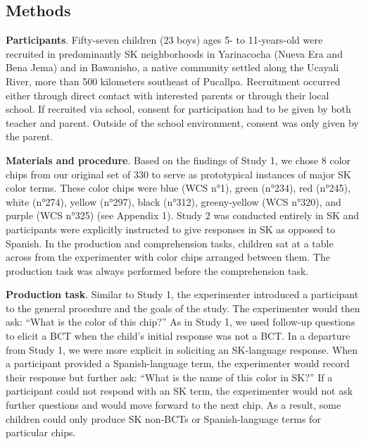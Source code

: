\documentclass[
  english,
  ,man,floatsintext]{apa6}
\begin{document}
\hypertarget{methods-1}{%
\subsection{Methods}\label{methods-1}}

\textbf{Participants}. Fifty-seven children (23 boys) ages 5- to 11-years-old were recruited in predominantly SK neighborhoods in Yarinacocha (Nueva Era and Bena Jema) and in Bawanisho, a native community settled along the Ucayali River, more than 500 kilometers southeast of Pucallpa. Recruitment occurred either through direct contact with interested parents or through their local school. If recruited via school, consent for participation had to be given by both teacher and parent. Outside of the school environment, consent was only given by the parent.

\textbf{Materials and procedure}. Based on the findings of Study 1, we chose 8 color chips from our original set of 330 to serve as prototypical instances of major SK color terms. These color chips were blue (WCS n°1), green (n°234), red (n°245), white (n°274), yellow (n°297), black (n°312), greeny-yellow (WCS n°320), and purple (WCS n°325) (see Appendix 1). Study 2 was conducted entirely in SK and participants were explicitly instructed to give responses in SK as opposed to Spanish. In the production and comprehension tasks, children sat at a table across from the experimenter with color chips arranged between them. The production task was always performed before the comprehension task.

\textbf{Production task}. Similar to Study 1, the experimenter introduced a participant to the general procedure and the goals of the study. The experimenter would then ask: \enquote{What is the color of this chip?} As in Study 1, we used follow-up questions to elicit a BCT when the child's initial response was not a BCT. In a departure from Study 1, we were more explicit in soliciting an SK-language response. When a participant provided a Spanish-language term, the experimenter would record their response but further ask: \enquote{What is the name of this color in SK?} If a participant could not respond with an SK term, the experimenter would not ask further questions and would move forward to the next chip. As a result, some children could only produce SK non-BCTs or Spanish-language terms for particular chips.
\end{document}
